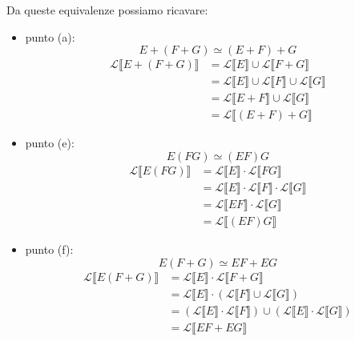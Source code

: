 		Da queste equivalenze possiamo ricavare:
		\begin{itemize}
		  \item punto (a):$$ E+(F+G) \simeq (E+F)+G $$  		  
		  	\begin{align*}
		  		\mathcal{L} \llbracket E+(F+G) \rrbracket &= \mathcal{L}
		  		\llbracket E \rrbracket \cup \mathcal{L}
		  		\llbracket F + G \rrbracket \\ &= \mathcal{L}
		  		\llbracket E \rrbracket \cup \mathcal{L}
		  		\llbracket F \rrbracket \cup \mathcal{L}
		  		\llbracket G \rrbracket \\ &= \mathcal{L}
		  		\llbracket E + F \rrbracket \cup \mathcal{L}
		  		\llbracket G \rrbracket \\ &= \mathcal{L} \llbracket (E + F) + G
		  		\rrbracket
		  	\end{align*}
		  \item punto (e): $$E(FG) \simeq (EF)G$$
		  	\begin{align*}
		  		\mathcal{L} \llbracket E(FG) \rrbracket &= \mathcal{L} \llbracket E
		  		\rrbracket \cdot \mathcal{L} \llbracket FG \rrbracket \\ &= \mathcal{L} \llbracket E \rrbracket \cdot
		  		\mathcal{L} \llbracket F \rrbracket \cdot \mathcal{L} \llbracket G
		  		\rrbracket \\ &= \mathcal{L} \llbracket EF \rrbracket \cdot \mathcal{L}
		  		\llbracket G \rrbracket \\ &= \mathcal{L} \llbracket (EF)G \rrbracket
		  	\end{align*}
		  \item punto (f): $$E(F+G) \simeq EF + EG$$
		  	\begin{align*}
		  		\mathcal{L} \llbracket E(F+G) \rrbracket &= \mathcal{L} \llbracket E
		  		\rrbracket \cdot \mathcal{L} \llbracket F+G \rrbracket \\ &= \mathcal{L} \llbracket E
		  		\rrbracket \cdot (\mathcal{L} \llbracket F \rrbracket \cup \mathcal{L}
		  		\llbracket G \rrbracket) \\ &= (\mathcal{L} \llbracket E \rrbracket \cdot
		  		\mathcal{L} \llbracket F \rrbracket) \cup (\mathcal{L} \llbracket E
		  		\rrbracket \cdot \mathcal{L} \llbracket G \rrbracket) \\ &= \mathcal{L}
		  		\llbracket EF + EG
		  		\rrbracket
		  	\end{align*}
		\end{itemize}
		
		\newpage
			
